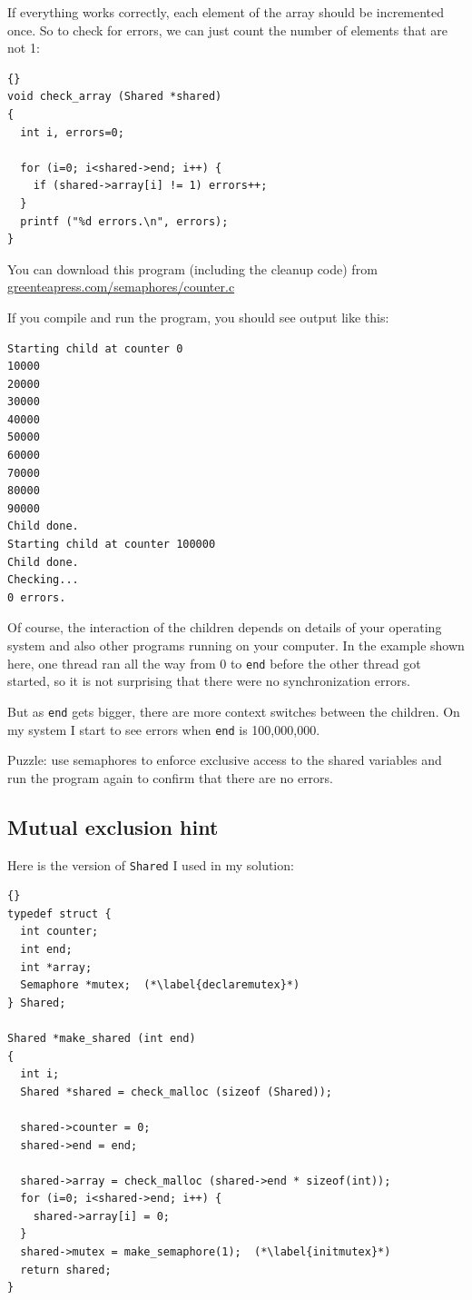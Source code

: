 \documentclass{book}
\newcommand{\clearemptydoublepage}{\newpage\cleardoublepage}
\begin{document}
If everything works correctly, each element of the array should be
incremented once.  So to check for errors, we can just count the
number of elements that are not 1:

\begin{lstlisting}[caption={}]{}
void check_array (Shared *shared)
{
  int i, errors=0;

  for (i=0; i<shared->end; i++) {
    if (shared->array[i] != 1) errors++;
  }
  printf ("%d errors.\n", errors);
}
\end{lstlisting}

You can download this program (including the cleanup code) from
\url{greenteapress.com/semaphores/counter.c}

If you compile and run the program, you should see output like this:

\begin{verbatim}
Starting child at counter 0
10000
20000
30000
40000
50000
60000
70000
80000
90000
Child done.
Starting child at counter 100000
Child done.
Checking...
0 errors.
\end{verbatim}

Of course, the interaction of the children depends on details
of your operating system and also other programs running on your
computer.  In the example shown here, one thread ran all the way
from 0 to {\tt end} before the other thread got started, so it is
not surprising that there were no synchronization errors.

But as {\tt end} gets bigger, there are more context switches between
the children.  On my system I start to see errors when
{\tt end} is 100,000,000.

Puzzle: use semaphores to enforce exclusive access to the shared
variables and run the program again to confirm that there are
no errors.

\clearemptydoublepage
\subsection{Mutual exclusion hint}

Here is the version of {\tt Shared} I used in my solution:

\begin{lstlisting}[caption={}]{}
typedef struct {
  int counter;
  int end;
  int *array;
  Semaphore *mutex;  (*\label{declaremutex}*)
} Shared;

Shared *make_shared (int end)
{
  int i;
  Shared *shared = check_malloc (sizeof (Shared));

  shared->counter = 0;
  shared->end = end;

  shared->array = check_malloc (shared->end * sizeof(int));
  for (i=0; i<shared->end; i++) {
    shared->array[i] = 0;
  }
  shared->mutex = make_semaphore(1);  (*\label{initmutex}*)
  return shared;
}
\end{lstlisting}
\end{document}
